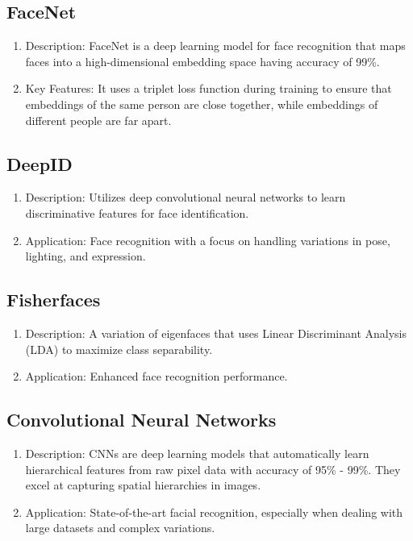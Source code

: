 \subsection{FaceNet}
\begin{enumerate}
\item Description: FaceNet is a deep learning model for face recognition that maps faces into a high-dimensional embedding space having accuracy of 99\%.
\item Key Features: It uses a triplet loss function during training to ensure that embeddings of the same person are close together, while embeddings of different people are far apart.
\end{enumerate}

\subsection{DeepID}
\begin{enumerate}
\item Description: Utilizes deep convolutional neural networks to learn discriminative features for face identification.
\item Application: Face recognition with a focus on handling variations in pose, lighting, and expression.
\end{enumerate}

\subsection{Fisherfaces}
\begin{enumerate}
\item Description: A variation of eigenfaces that uses Linear Discriminant Analysis (LDA) to maximize class separability.
\item Application: Enhanced face recognition performance.
\end{enumerate}

\subsection{Convolutional Neural Networks}
\begin{enumerate}
    \item Description: CNNs are deep learning models that automatically learn hierarchical features from raw pixel data with accuracy of 95\% - 99\%. They excel at capturing spatial hierarchies in images.
\item Application: State-of-the-art facial recognition, especially when dealing with large datasets and complex variations.
\end{enumerate}


